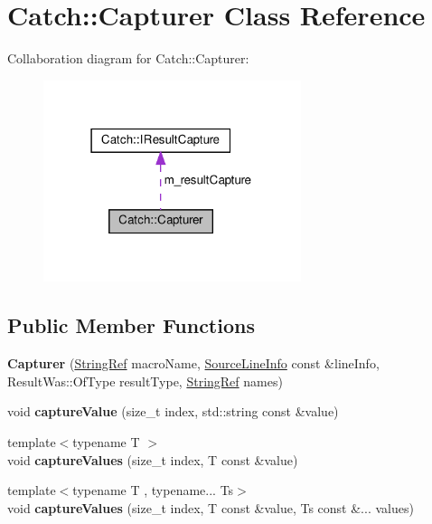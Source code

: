 \hypertarget{classCatch_1_1Capturer}{}\section{Catch\+:\+:Capturer Class Reference}
\label{classCatch_1_1Capturer}


Collaboration diagram for Catch\+:\+:Capturer\+:
\nopagebreak
\begin{figure}[H]
\begin{center}
\leavevmode
\includegraphics[width=214pt]{classCatch_1_1Capturer__coll__graph}
\end{center}
\end{figure}
\subsection*{Public Member Functions}
\begin{DoxyCompactItemize}
\item 
\mbox{\label{classCatch_1_1Capturer_a86b0b27acc803a4e1310c10820f3038f}} 
{\bfseries Capturer} (\hyperlink{classCatch_1_1StringRef}{String\+Ref} macro\+Name, \hyperlink{structCatch_1_1SourceLineInfo}{Source\+Line\+Info} const \&line\+Info, Result\+Was\+::\+Of\+Type result\+Type, \hyperlink{classCatch_1_1StringRef}{String\+Ref} names)
\item 
\mbox{\label{classCatch_1_1Capturer_a0695ebf77f7cdcb344c73bcb3d9131e4}} 
void {\bfseries capture\+Value} (size\+\_\+t index, std\+::string const \&value)
\item 
\mbox{\label{classCatch_1_1Capturer_a60d08e6db2e54740bb2298bbbec3bc0b}} 
{\footnotesize template$<$typename T $>$ }\\void {\bfseries capture\+Values} (size\+\_\+t index, T const \&value)
\item 
\mbox{\label{classCatch_1_1Capturer_a76f2a097cfeb3042688300b81eb9bcbc}} 
{\footnotesize template$<$typename T , typename... Ts$>$ }\\void {\bfseries capture\+Values} (size\+\_\+t index, T const \&value, Ts const \&... values)
\end{DoxyCompactItemize}
